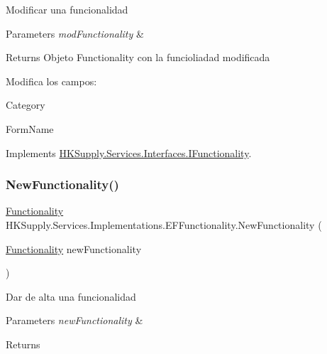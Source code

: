 Modificar una funcionalidad 


\begin{DoxyParams}{Parameters}
{\em mod\+Functionality} & \\
\hline
\end{DoxyParams}
\begin{DoxyReturn}{Returns}
Objeto Functionality con la funcioliadad modificada
\end{DoxyReturn}


Modifica los campos\+:
\begin{DoxyItemize}
\item Category
\item Form\+Name 
\end{DoxyItemize}

Implements \hyperlink{interface_h_k_supply_1_1_services_1_1_interfaces_1_1_i_functionality}{H\+K\+Supply.\+Services.\+Interfaces.\+I\+Functionality}.

\mbox{\label{class_h_k_supply_1_1_services_1_1_implementations_1_1_e_f_functionality_a43852b181d280c78c7c00b9d11c6d6c4}} 
\subsubsection{\texorpdfstring{New\+Functionality()}{NewFunctionality()}}
{\footnotesize\ttfamily \hyperlink{class_h_k_supply_1_1_models_1_1_functionality}{Functionality} H\+K\+Supply.\+Services.\+Implementations.\+E\+F\+Functionality.\+New\+Functionality (\begin{DoxyParamCaption}\item[{\hyperlink{class_h_k_supply_1_1_models_1_1_functionality}{Functionality}}]{new\+Functionality }\end{DoxyParamCaption})}



Dar de alta una funcionalidad 


\begin{DoxyParams}{Parameters}
{\em new\+Functionality} & \\
\hline
\end{DoxyParams}
\begin{DoxyReturn}{Returns}

\end{DoxyReturn}



